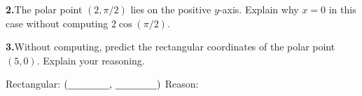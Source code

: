 \documentclass[10pt]{article}
\begin{document}
\begin{tcolorbox}[colback=white, colframe=black!40,
    title=\textbf{Tier R --- Reinforce},
    fonttitle=\bfseries, arc=2mm, left=3mm, right=3mm, top=2mm, bottom=2mm]
\vspace{8pt}
\textbf{2.}\quad The polar point $(2, \pi/2)$ lies on the positive $y$-axis.
Explain why $x = 0$ in this case without computing $2\cos(\pi/2)$.


\vspace{6pt}
\textbf{3.}\quad Without computing, predict the rectangular coordinates
of the polar point $(5, 0)$. Explain your reasoning.

\vspace{4pt}
Rectangular: $(\underline{\hspace{1.5cm}},\, \underline{\hspace{1.5cm}})$ \quad Reason: \writeline

\end{tcolorbox}

\vspace{0.08in}
\end{document}
